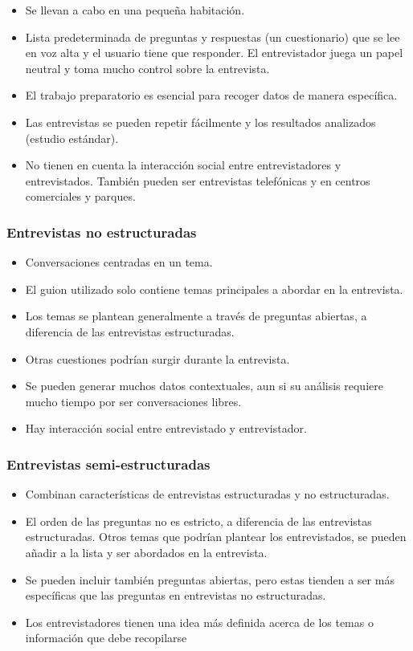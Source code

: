 \documentclass[12pt, twoside, openright]{report} %
\begin{document}
\begin{itemize}
	\item Se llevan a cabo en una pequeña habitación.
	\item Lista predeterminada de preguntas y respuestas (un
	      cuestionario) que se lee en voz alta y el usuario tiene que
	      responder. El entrevistador juega un papel neutral y toma
	      mucho control sobre la entrevista.
	\item El trabajo preparatorio es esencial para recoger datos de
	      manera específica.
	\item Las entrevistas se pueden repetir fácilmente y los resultados
	      analizados (estudio estándar).
	\item No tienen en cuenta la interacción social entre
	      entrevistadores y entrevistados. También pueden ser
	      entrevistas telefónicas y en centros comerciales y parques.
\end{itemize}

\subsubsection{Entrevistas no estructuradas}

\begin{itemize}
	\item Conversaciones centradas en un tema.
	\item El guion utilizado solo contiene temas principales a abordar
	      en la entrevista.
	\item Los temas se plantean generalmente a través de preguntas
	      abiertas, a diferencia de las entrevistas estructuradas.
	\item Otras cuestiones podrían surgir durante la entrevista.
	\item Se pueden generar muchos datos contextuales, aun si su
	      análisis requiere mucho tiempo por ser conversaciones libres.
	\item Hay interacción social entre entrevistado y entrevistador.
\end{itemize}

\subsubsection{Entrevistas semi-estructuradas}

\begin{itemize}
	\item Combinan características de entrevistas estructuradas y no
	      estructuradas.
	\item El orden de las preguntas no es estricto, a diferencia de las
	      entrevistas estructuradas. Otros temas que podrían plantear
	      los entrevistados, se pueden añadir a la lista y ser abordados
	      en la entrevista.
	\item Se pueden incluir también preguntas abiertas, pero estas
	      tienden a ser más específicas que las preguntas en entrevistas
	      no estructuradas.
	\item Los entrevistadores tienen una idea más definida acerca de los
	      temas o información que debe recopilarse
\end{itemize}
\end{document}
